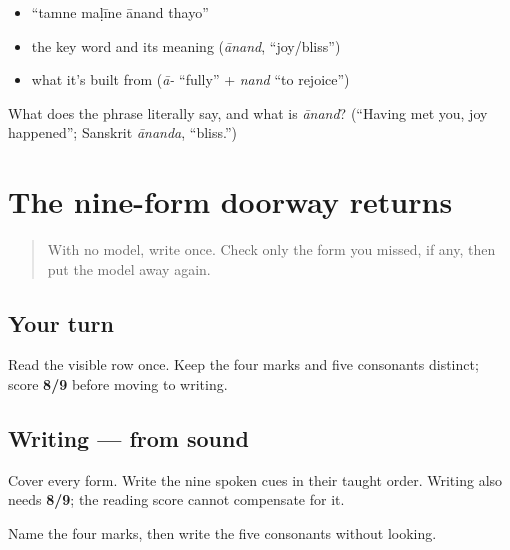 \begin{itemize}
\raggedright
  \item \textquotedblleft{}tamne maḷīne ānand thayo\textquotedblright{}
  \item the key word and its meaning (\emph{ānand}, \textquotedblleft{}joy/bliss\textquotedblright{})
  \item what it's built from (\emph{ā-} \textquotedblleft{}fully\textquotedblright{} + \emph{nand} \textquotedblleft{}to rejoice\textquotedblright{})
\end{itemize}

\begin{tcolorbox}[breakable,colback=teal!4,colframe=teal!35!black,title={Before you move on}]
What does the phrase literally say, and what is \emph{ānand}? (\textquotedblleft{}Having met you, joy happened\textquotedblright{}; Sanskrit \emph{ānanda}, \textquotedblleft{}bliss.\textquotedblright{})
\end{tcolorbox}
\section[ja — o sign — nasal mark — long-ii …]{The nine-form doorway returns}

\label{lesson:GU-R04-doorway-nine-r2}



\begin{quote}
With no model, write \textbf{  } once. Check only the form you missed, if any, then put the model away again.
\end{quote}

\subsection*{Your turn}
Read the visible row once. Keep the four marks and five consonants distinct; score \textbf{8/9} before moving to writing.

\subsection*{Writing — from sound}
Cover every form. Write the nine spoken cues in their taught order. Writing also needs \textbf{8/9}; the reading score cannot compensate for it.

\begin{tcolorbox}[breakable,colback=teal!4,colframe=teal!35!black,title={Before you move on}]
Name the four marks, then write the five consonants without looking.
\end{tcolorbox}
